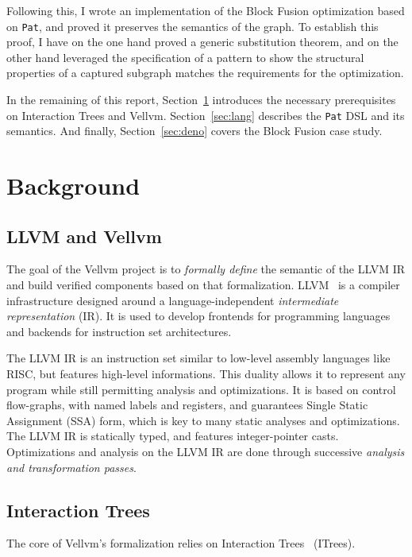 \documentclass[11pt]{article}
\newcommand{\pat}{\texttt{Pat}\xspace}
\begin{document}
Following this, I wrote an implementation of the Block Fusion optimization based on \pat{}, and proved it preserves the semantics of the graph. To establish this proof, I have on the one hand proved a generic substitution theorem, and on the other hand leveraged the specification of a pattern to show the structural properties of a captured subgraph matches the requirements for the optimization.

In the remaining of this report, Section~\ref{sec:background} introduces the necessary prerequisites on Interaction Trees and Vellvm. Section~\ref{sec:lang} describes the \pat{} DSL and its semantics. And finally, Section~\ref{sec:deno} covers the Block Fusion case study.

\section{Background}
\label{sec:background}

\subsection{LLVM and Vellvm}

The goal of the Vellvm project is to \emph{formally define} the semantic of the LLVM IR and build verified
components based on that formalization.
%
LLVM~\cite{LLVM} is a compiler infrastructure designed around a language-independent \emph{intermediate representation} (IR). It is used to develop frontends for programming languages and backends for instruction set architectures.

The LLVM IR is an instruction set similar to low-level assembly languages like RISC, but features high-level informations. This duality allows it to represent any program while still permitting analysis and optimizations. It is based on control flow-graphs, with named labels and registers, and guarantees Single Static Assignment (SSA) form, which is key to many static analyses and optimizations. The LLVM IR is statically typed, and features integer-pointer casts.
%
Optimizations and analysis on the LLVM IR are done through successive \emph{analysis and transformation passes}.

\subsection{Interaction Trees}

The core of Vellvm's formalization relies on Interaction Trees~\cite{ITrees} (ITrees).
\end{document}

